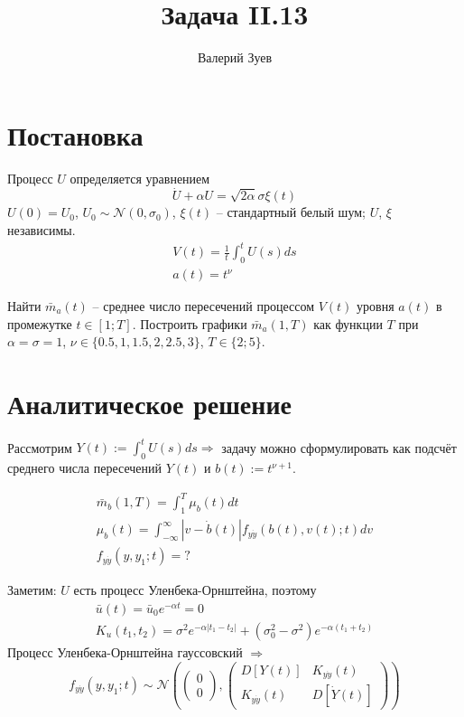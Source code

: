 \documentclass[a4paper,14pt]{extarticle}
\begin{document}
\title{Задача II.13}
\author{Валерий Зуев}
\maketitle

\section{Постановка}

\newcommand{\al}{\alpha}
\newcommand{\g}{\gamma}
\newcommand{\s}{\sigma}
\newcommand{\z}{\zeta}

Процесс $U$ определяется уравнением
\[ \dot U + \al U = \sqrt{2\al} \s \xi(t) \]
$U(0)=U_0$, $U_0 \sim \mathcal{N}(0,\s_0)$, $\xi(t)$ -- стандартный белый шум; $U$, $\xi$ независимы.
\begin{gather*}
    V(t) = \frac{1}{t} \int_0^t U(s)ds \\
    a(t) = t^\nu
\end{gather*}

Найти $\bar m_a(t)$ -- среднее число пересечений процессом $V(t)$ уровня $a(t)$ в промежутке $ t \in [1;T] $.
Построить графики $\bar m_a(1,T)$ как функции $T$ при $\al=\s=1$, $ \nu \in \{ 0.5, 1, 1.5, 2, 2.5, 3 \} $, $T \in \{ 2;5\}$.

\section{Аналитическое решение}

Рассмотрим $ Y(t) := \int_0^t U(s)ds \Rightarrow $ задачу можно сформулировать как подсчёт среднего числа пересечений $Y(t)$ и $b(t) := t^{\nu+1}$.

\begin{gather*}
    \bar m_b(1,T) = \int_1^T \mu_b(t) dt \\
    \mu_b(t) = \int_{-\infty}^\infty |v-\dot b(t)| f_{y \dot y} (b(t),v(t);t) dv \\
    f_{y \dot y}(y,y_1;t) = ?
\end{gather*}

Заметим: $U$ есть процесс Уленбека-Орнштейна, поэтому
\begin{gather*}
    \bar u(t) = \bar u_0 e^{-\al t} = 0 \\
    K_u(t_1,t_2) = \s^2 e^{-\al |t_1-t_2|} +(\s_0^2-\s^2)e^{-\al(t_1+t_2)}
\end{gather*}
Процесс Уленбека-Орнштейна гауссовский $\Rightarrow$
\[ f_{y \dot y}(y,y_1;t) \sim \mathcal{N}\left( \begin{pmatrix}
    0 \\ 0
\end{pmatrix},
\begin{pmatrix}
    D[Y(t)] & K_{y \dot y}(t) \\
    K_{y \dot y}(t) & D[\dot Y(t)]
\end{pmatrix} \right) \]
\end{document}
